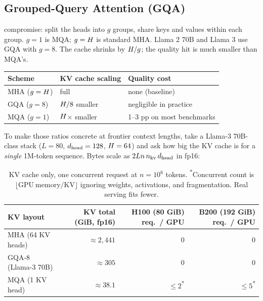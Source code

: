 \subsection{Grouped-Query Attention (GQA)}

\citet{ainslie2023gqa} compromise: split the heads into \(g\) groups, share
keys and values within each group. \(g = 1\) is MQA; \(g = H\) is
standard MHA. Llama 2 70B and Llama 3 use GQA with \(g = 8\). The cache
shrinks by \(H / g\); the quality hit is much smaller than MQA's.

\begin{center}
\begin{tabular}{lll}
\toprule
Scheme & KV cache scaling & Quality cost \\
\midrule
MHA  (\(g = H\)) & full                 & none (baseline) \\
GQA  (\(g = 8\))      & \(H/8\) smaller & negligible in practice \\
MQA  (\(g = 1\))      & \(H\)$\times$ smaller & 1--3 pp on most benchmarks \\
\bottomrule
\end{tabular}
\end{center}

To make those ratios concrete at frontier context lengths, take a Llama-3
70B-class stack (\(L = 80\), \(d_{\text{head}} = 128\), \(H = 64\)) and ask
how big the KV cache is for a \emph{single} 1M-token sequence. Bytes
scale as \(2 L n\, n_{\mathrm{kv}}\, d_{\text{head}}\) in fp16:

\begin{table}[htbp]
\noindent
\small
\begin{tabular}{@{}lrrr@{}}
\toprule
KV layout & KV total (GiB, fp16) & H100 (80 GiB) req.\ / GPU & B200 (192 GiB) req.\ / GPU \\
\midrule
MHA (64 KV heads) & \(\approx 2{,}441\) & 0 & 0 \\
GQA-8 (Llama-3 70B) & \(\approx 305\) & 0 & 0 \\
MQA (1 KV head) & \(\approx 38.1\) & \(\le 2\)\textsuperscript{*} & \(\le 5\)\textsuperscript{*} \\
\bottomrule
\end{tabular}
\caption{KV cache only, one concurrent request at \(n = 10^{6}\) tokens.
\textsuperscript{*}Concurrent count is \(\lfloor \mathrm{GPU\ memory} / \mathrm{KV} \rfloor\) ignoring weights, activations, and fragmentation. Real serving fits fewer.}
\label{tab:kv-70b-1m}
\end{table}

